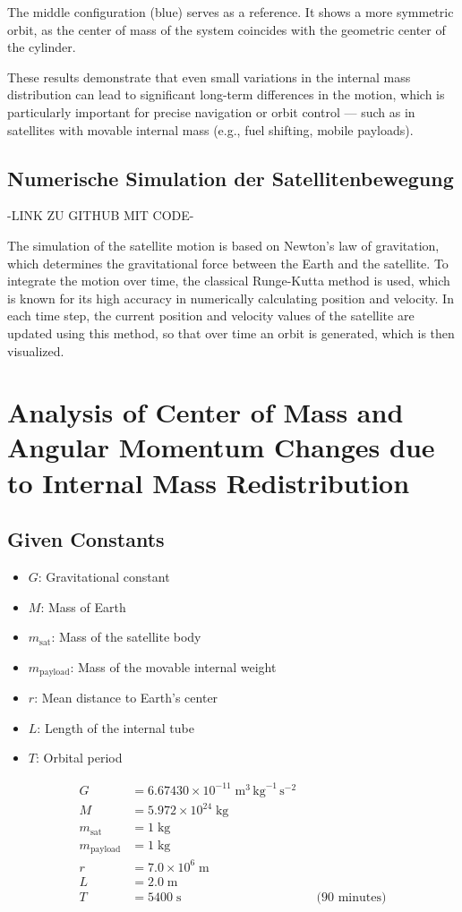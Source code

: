 \documentclass[conference]{IEEEtran}
\begin{document}
The middle configuration (blue) serves as a reference. It shows a more symmetric orbit, as the center of mass of the system coincides with the geometric center of the cylinder.

These results demonstrate that even small variations in the internal mass distribution can lead to significant long-term differences in the motion, which is particularly important for precise navigation or orbit control — such as in satellites with movable internal mass (e.g., fuel shifting, mobile payloads).


\subsection{Numerische Simulation der Satellitenbewegung}
-LINK ZU GITHUB MIT CODE-

The simulation of the satellite motion is based on Newton's law of gravitation, which determines the gravitational force between the Earth and the satellite. To integrate the motion over time, the classical Runge-Kutta method is used, which is known for its high accuracy in numerically calculating position and velocity. In each time step, the current position and velocity values of the satellite are updated using this method, so that over time an orbit is generated, which is then visualized.


\section{Analysis of Center of Mass and Angular Momentum Changes due to Internal Mass Redistribution}

\subsection{Given Constants}

\begin{itemize}
  \item \( G \): Gravitational constant
  \item \( M \): Mass of Earth
  \item \( m_\text{sat} \): Mass of the satellite body
  \item \( m_\text{payload} \): Mass of the movable internal weight
  \item \( r \): Mean distance to Earth's center
  \item \( L \): Length of the internal tube
  \item \( T \): Orbital period
\end{itemize}
\begin{align*}
G &= 6.67430 \times 10^{-11} \; \text{m}^3\,\text{kg}^{-1}\,\text{s}^{-2} \\
M &= 5.972 \times 10^{24} \; \text{kg}  \\
m_\text{sat} &= 1 \; \text{kg}  \\
m_\text{payload} &= 1 \; \text{kg} \\
r &= 7.0 \times 10^6 \; \text{m}  \\
L &= 2.0 \; \text{m}  \\
T &= 5400 \; \text{s} && \text{(90 minutes)}
\end{align*}
\end{document}
